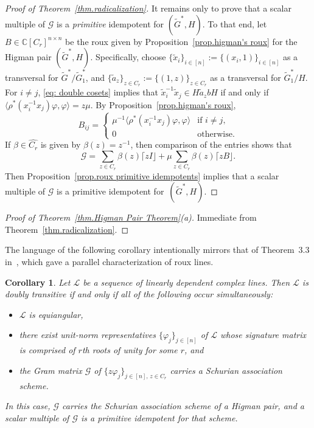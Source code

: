 \documentclass[11pt]{article}
\newtheorem{corollary}[theo]{Corollary}
\theoremstyle{definition}
\numberwithin{equation}{section}
\begin{document}
\begin{proof}[Proof of Theorem~\ref{thm.radicalization}]
It remains only to prove that a scalar multiple of $\mathcal{G}$ is a \emph{primitive} idempotent for $(\widetilde{G}^*,H)$.
To that end, let $B \in \mathbb{C}[C_r]^{n\times n}$ be the roux given by Proposition~\ref{prop.higman's roux} for the Higman pair $(\widetilde{G}^*,H)$.
Specifically, choose $\{ \tilde{x}_i \}_{i\in [n]} := \{ (x_i,1) \}_{i \in [n]}$ as a transversal for $\widetilde{G}^*/\widetilde{G}_1^*$, and $\{ \tilde{a}_z \}_{z\in C_r} := \{ (1,z) \}_{z \in C_r}$ as a transversal for $\tilde{G}_1^* / H$.
For $i \neq j$, \eqref{eq: double cosets} implies that $\tilde{x}_i^{-1} \tilde{x}_j \in H \tilde{a}_z b H$ if and only if $\langle \rho^*(x_i^{-1} x_j) \varphi, \varphi \rangle = z \mu$.
By Proposition~\ref{prop.higman's roux},
\[ B_{ij} 
= \begin{cases}
 \mu^{-1} \langle  \rho^*(x_i^{-1} x_j) \varphi, \varphi \rangle & \text{if }i\neq j, \\
 0 & \text{otherwise}.
 \end{cases}
 \]
 If $\beta \in \hat{C_r}$ is given by $\beta(z) = z^{-1}$, then comparison of the entries shows that 
 \[ \mathcal{G} = \sum_{z \in C_r} \beta(z) \lceil z I \rfloor + \mu \sum_{z\in C_r} \beta(z) \lceil z B \rfloor. \]
 Then Proposition~\ref{prop.roux primitive idempotents} implies that a scalar multiple of $\mathcal{G}$ is a primitive idempotent for~$(\widetilde{G}^*,H)$.
 \end{proof}

\begin{proof}[Proof of Theorem~\ref{thm.Higman Pair Theorem}(a)]
Immediate from Theorem~\ref{thm.radicalization}.
\end{proof}

The language of the following corollary intentionally mirrors that of Theorem~3.3 in~\cite{IversonM:18}, which gave a parallel characterization of roux lines.

\begin{corollary}
Let $\mathscr{L}$ be a sequence of linearly dependent complex lines.
Then $\mathscr{L}$ is doubly transitive if and only if all of the following occur simultaneously:
\begin{itemize}
\item[(a)]
$\mathscr{L}$ is equiangular,
\item[(b)]
there exist unit-norm representatives $\{ \varphi_j \}_{j\in [n]}$ of $\mathscr{L}$ whose signature matrix is comprised of $r$th roots of unity for some $r$, and
\item[(c)]
the Gram matrix $\mathcal{G}$ of $\{ z \varphi_j \}_{j \in [n],\, z \in C_r}$ carries a Schurian association scheme.
\end{itemize}
In this case, $\mathcal{G}$ carries the Schurian association scheme of a Higman pair, and a scalar multiple of $\mathcal{G}$ is a primitive idempotent for that scheme.
\end{corollary}
\end{document}
